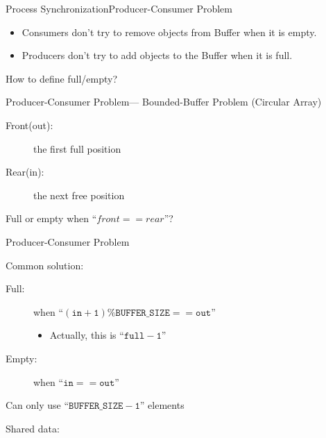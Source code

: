 \begin{frame}{Process Synchronization}{Producer-Consumer Problem}
  \begin{itemize}
  \item Consumers don't try to remove objects from Buffer when it is empty.
  \item Producers don't try to add objects to the Buffer when it is full.
  \end{itemize}
  \begin{center}
  \end{center}
  \begin{center}
    How to define \alert{full/empty}?
  \end{center}
\end{frame}

\begin{frame}{Producer-Consumer Problem}{--- Bounded-Buffer Problem (Circular Array)}
  \begin{minipage}{.5\linewidth}
  \begin{description}
  \item[Front(out):] the first full position
  \item[Rear(in):] the next free position
  \end{description}
  \end{minipage}\quad
  \begin{minipage}{.45\linewidth}
  \end{minipage}
  
  Full or empty when ``$front == rear$''?
\end{frame}

\begin{frame}{Producer-Consumer Problem}
  \begin{block}{Common solution:}
    \begin{description}
    \item[Full:] when ``$\mathtt{(in+1)\%BUFFER\_SIZE == out}$''
      \begin{itemize}
      \item[] Actually, this is ``$\mathtt{full - 1}$''
      \end{itemize}
    \item[Empty:] when ``$\mathtt{in == out}$''
    \end{description}
    Can only use ``$\mathtt{BUFFER\_SIZE-1}$'' elements
  \end{block}
  
  \begin{block}{Shared data:}
    \begin{center}
    \end{center}
  \end{block}
\end{frame}

